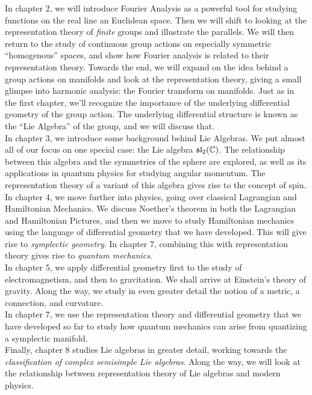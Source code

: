 \documentclass[../master.tex]{subfiles}
\begin{document}
	In chapter 2, we will introduce Fourier Analysis as a powerful tool for studying functions on the real line an Euclidean space. Then we will shift to looking at the representation theory of \emph{finite} groups and illustrate the parallels. We will then return to the study of continuous group actions on especially symmetric ``homogenous'' spaces, and show how Fourier analysis is related to their representation theory. Towards the end, we will expand on the idea behind a group actions on manifolds and look at the representation theory, giving a small glimpse into harmonic analysis: the Fourier transform on manifolds. Just as in the first chapter, we'll recognize the importance of the underlying differential geometry of the group action. The underlying differential structure is known as the ``Lie Algebra'' of the group, and we will discuss that.\\
	
	In chapter 3, we introduce some background behind Lie Algebras. We put almost all of our focus on one special case: the Lie algebra $\frak{sl}_2 (\mathbb C)$. The relationship between this algebra and the symmetries of the sphere are explored, as well as its applications in quantum physics for studying angular momentum. The representation theory of a variant of this algebra gives rise to the concept of spin. \\
	
	In chapter 4, we move further into physics, going over classical Lagrangian and Hamiltonian Mechanics. We discuss Noether's theorem in both the Lagrangian and Hamiltonian Pictures, and then we move to study Hamiltonian mechanics using the language of differential geometry that we have developed. This will give rise to \emph{symplectic geometry}. In chapter 7, combining this with representation theory gives rise to \emph{quantum mechanics}.\\
	
	In chapter 5, we apply differential geometry first to the study of electromagnetism, and then to gravitation. We shall arrive at Einstein's theory of gravity. Along the way, we study in even greater detail the notion of a metric, a connection, and curvature. \\
	
	In chapter 7, we use the representation theory and differential geometry that we have developed so far to study how quantum mechanics can arise from quantizing a symplectic manifold.\\
	
	Finally, chapter 8 studies Lie algebras in greater detail, working towards the \emph{classification of complex semisimple Lie algebras}. Along the way, we will look at the relationship between representation theory of Lie algebras and modern physics. 
	
	
	
	
\end{document}
